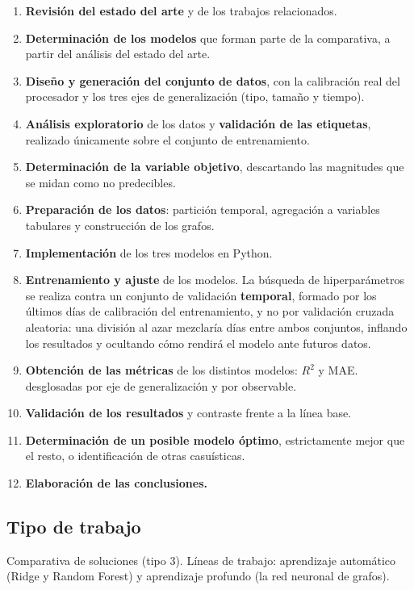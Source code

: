 \begin{enumerate}
    \item \textbf{Revisión del estado del arte} y de los trabajos relacionados.
    \item \textbf{Determinación de los modelos} que forman parte de la comparativa, a partir
          del análisis del estado del arte.
    \item \textbf{Diseño y generación del conjunto de datos}, con la calibración real del
          procesador y los tres ejes de generalización (tipo, tamaño y tiempo).
    \item \textbf{Análisis exploratorio} de los datos y \textbf{validación de las etiquetas},
          realizado únicamente sobre el conjunto de entrenamiento.
    \item \textbf{Determinación de la variable objetivo}, descartando las magnitudes que se
          midan como no predecibles.
    \item \textbf{Preparación de los datos}: partición temporal, agregación a variables
          tabulares y construcción de los grafos.
    \item \textbf{Implementación} de los tres modelos en Python.
    \item \textbf{Entrenamiento y ajuste} de los modelos. La búsqueda de hiperparámetros se
          realiza contra un conjunto de validación \textbf{temporal}, formado por los últimos
          días de calibración del entrenamiento, y no por validación cruzada aleatoria: una división al azar mezclaría días entre ambos conjuntos, inflando los resultados y ocultando cómo rendirá el modelo ante futuros datos.
    \item \textbf{Obtención de las métricas} de los distintos modelos: $R^2$ y MAE.
          desglosadas por eje de generalización y por observable.
    \item \textbf{Validación de los resultados} y contraste frente a la línea base.
    \item \textbf{Determinación de un posible modelo óptimo}, estrictamente mejor que el
          resto, o identificación de otras casuísticas.
    \item \textbf{Elaboración de las conclusiones.}
\end{enumerate}


\subsection{Tipo de trabajo}
\label{sec:tipo_trabajo}
Comparativa de soluciones (tipo 3). Líneas de trabajo: aprendizaje automático (Ridge y Random
Forest) y aprendizaje profundo (la red neuronal de grafos).

